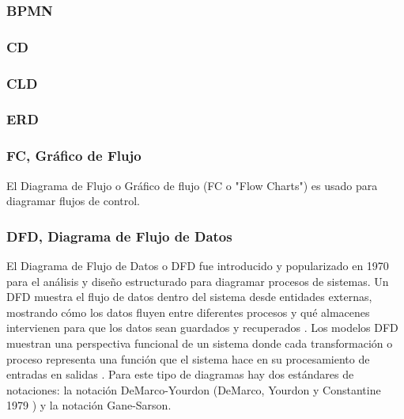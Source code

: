 \subsubsection{BPMN}

\subsubsection{CD}

\subsubsection{CLD}

\subsubsection{ERD}

\subsubsection{FC, Gráfico de Flujo}

El Diagrama de Flujo o Gráfico de flujo (FC o "Flow Charts") es usado para diagramar flujos de control.

\subsubsection{DFD, Diagrama de Flujo de Datos}

El Diagrama de Flujo de Datos o DFD fue introducido y popularizado en 1970 para el análisis y diseño estructurado \cite{Gane-Sarson-1979} para diagramar procesos de sistemas. Un DFD muestra el flujo de datos dentro del sistema desde entidades externas, mostrando cómo los datos fluyen entre diferentes procesos y qué almacenes intervienen para que los datos sean guardados y recuperados \cite{Scott-Ambler-2004}. Los modelos DFD muestran una perspectiva funcional de un sistema donde cada transformación o proceso representa una función que el sistema hace en su procesamiento de entradas en salidas \cite{Sommerville-2006}.\newline
Para este tipo de diagramas hay dos estándares de notaciones: la notación DeMarco-Yourdon (DeMarco, Yourdon y Constantine 1979 \cite{Dixit-2007}) y la notación Gane-Sarson.\newline
\newline

